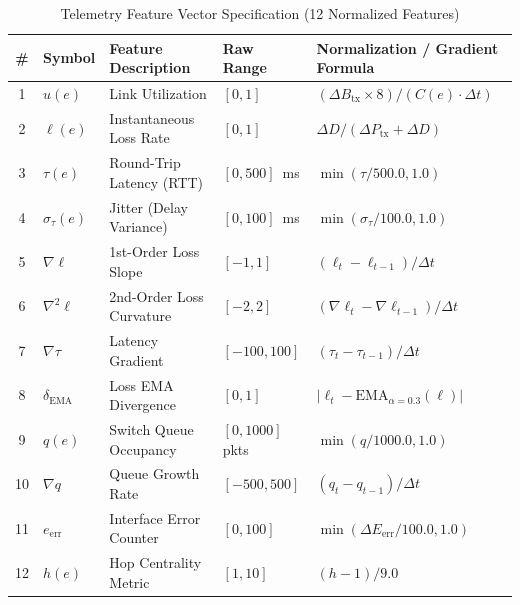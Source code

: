 \documentclass[11pt,a4paper]{report}
\begin{document}
\begin{table}[htbp]
\centering
\caption{Telemetry Feature Vector Specification (12 Normalized Features)}
\label{tab:features}
\footnotesize
\setlength{\tabcolsep}{3.5pt}
\begin{tabularx}{\linewidth}{@{} c l p{4.6cm} p{2.1cm} >{\raggedright\arraybackslash}X @{}}
\toprule
\textbf{\#} & \textbf{Symbol} & \textbf{Feature Description} & \textbf{Raw Range} & \textbf{Normalization / Gradient Formula} \\
\midrule
1  & $u(e)$           & Link Utilization            & $[0, 1]$           & $(\Delta B_{\text{tx}} \times 8) / (C(e) \cdot \Delta t)$ \\
2  & $\ell(e)$        & Instantaneous Loss Rate     & $[0, 1]$           & $\Delta D / (\Delta P_{\text{tx}} + \Delta D)$ \\
3  & $\tau(e)$        & Round-Trip Latency (RTT)    & $[0, 500]$~ms      & $\min(\tau / 500.0, 1.0)$ \\
4  & $\sigma_\tau(e)$ & Jitter (Delay Variance)     & $[0, 100]$~ms      & $\min(\sigma_\tau / 100.0, 1.0)$ \\
5  & $\nabla \ell$    & 1st-Order Loss Slope        & $[-1, 1]$          & $(\ell_t - \ell_{t-1}) / \Delta t$ \\
6  & $\nabla^2 \ell$  & 2nd-Order Loss Curvature    & $[-2, 2]$          & $(\nabla \ell_t - \nabla \ell_{t-1}) / \Delta t$ \\
7  & $\nabla \tau$    & Latency Gradient            & $[-100, 100]$      & $(\tau_t - \tau_{t-1}) / \Delta t$ \\
8  & $\delta_{\text{EMA}}$ & Loss EMA Divergence    & $[0, 1]$           & $|\ell_t - \text{EMA}_{\alpha=0.3}(\ell)|$ \\
9  & $q(e)$           & Switch Queue Occupancy      & $[0, 1000]$ pkts   & $\min(q / 1000.0, 1.0)$ \\
10 & $\nabla q$       & Queue Growth Rate           & $[-500, 500]$      & $(q_t - q_{t-1}) / \Delta t$ \\
11 & $e_{\text{err}}$ & Interface Error Counter     & $[0, 100]$         & $\min(\Delta E_{\text{err}} / 100.0, 1.0)$ \\
12 & $h(e)$           & Hop Centrality Metric       & $[1, 10]$          & $(h - 1) / 9.0$ \\
\bottomrule
\end{tabularx}
\end{table}
\end{document}
